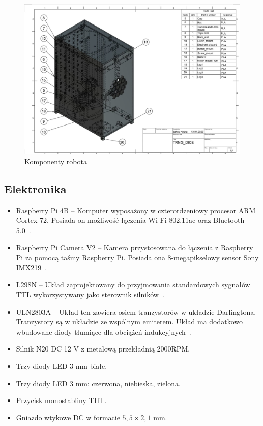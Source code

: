     \begin{figure}[H]
        \centering
        \includegraphics[width=0.95\linewidth]{chapters/03-praca-wlasna/figures/komponenty_pla.jpg}
        \caption{\label{fig:komponenty}Komponenty robota}
    \end{figure}

\subsection{Elektronika}
    \begin{itemize}
        \item Raspberry Pi 4B -- Komputer wyposażony w czterordzeniowy procesor ARM Cortex-72. Posiada on możliwość łączenia Wi-Fi 802.11ac oraz Bluetooth 5.0~\cite{malina}.
        \item Raspberry Pi Camera V2 -- Kamera przystosowana do łączenia z Raspberry Pi za pomocą taśmy Raspberry Pi. Posiada ona 8-megapikselowy sensor Sony IMX219~\cite{malina}.
        \item L298N -- Układ zaprojektowany do przyjmowania standardowych sygnałów TTL wykorzystywany jako sterownik silników~\cite{L298}.
        \item ULN2803A -- Układ ten zawiera osiem tranzystorów w układzie Darlingtona. Tranzystory są w układzie ze wspólnym emiterem. Układ ma dodatkowo wbudowane diody tłumiące dla obciążeń indukcyjnych~\cite{ULN2803a}.
        \item Silnik N20 DC 12 V z metalową przekładnią 2000RPM.
        \item Trzy diody LED 3 mm białe.
        \item Trzy diody LED 3 mm: czerwona, niebieska, zielona.
        \item Przycisk monostabliny THT.
        \item Gniazdo wtykowe DC w formacie $5,5 \times 2,1$ mm.
    \end{itemize}


